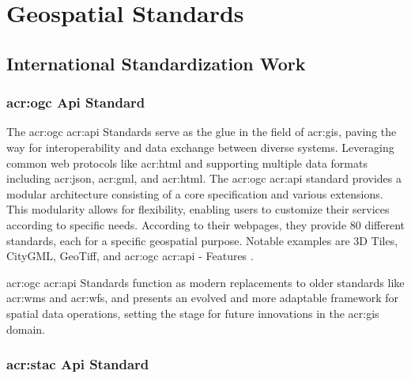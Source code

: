 \section{Geospatial Standards}\label{sec:geospatial-standards}

\subsection{International Standardization Work}\label{subsec:standardization-international}

\subsubsection[OGC Standards]{\acrshort{acr:ogc} Api Standard}\label{subsubsec:ogc}

The \gls{acr:ogc} \acrshort{acr:api} Standards serve as the glue in the field of \gls{acr:gis}, paving the way for interoperability and data exchange between diverse systems. Leveraging common web protocols like \acrshort{acr:html} and supporting multiple data formats including \acrshort{acr:json}, \acrshort{acr:gml}, and \acrshort{acr:html}. The \gls{acr:ogc} \acrshort{acr:api} standard provides a modular architecture consisting of a core specification and various extensions. This modularity allows for flexibility, enabling users to customize their services according to specific needs. According to their webpages, they provide 80 different standards, each for a specific geospatial purpose. Notable examples are 3D Tiles, CityGML, GeoTiff, and \acrshort{acr:ogc} \acrshort{acr:api} - Features \citep{ogcOGCStandards2023}.

\acrshort{acr:ogc} \acrshort{acr:api} Standards function as modern replacements to older standards like \acrshort{acr:wms} and \acrshort{acr:wfs}, and presents an evolved and more adaptable framework for spatial data operations, setting the stage for future innovations in the \acrshort{acr:gis} domain.

\subsubsection[STAC Api Standard]{\acrshort{acr:stac} Api Standard}\label{subsubsec:stac}

